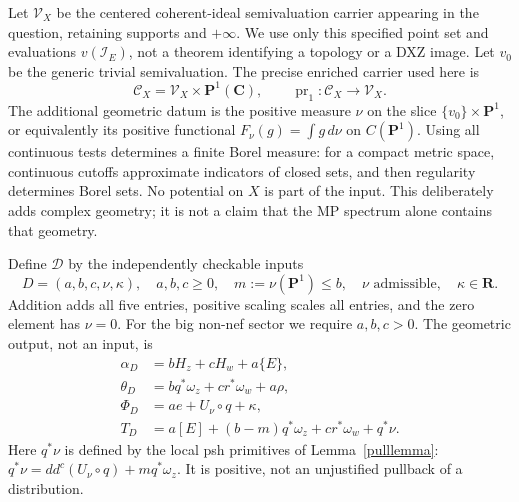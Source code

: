\documentclass[11pt]{article}
\theoremstyle{remark}\newtheorem{remark}[theorem]{Remark}
\newcommand{\ddc}{dd^c}
\newcommand{\PP}{\mathbf P^1}
\newcommand{\R}{\mathbf R}
\begin{document}
Let $\mathscr V_X$ be the centered coherent-ideal semivaluation
carrier appearing in the question, retaining supports and
$+\infty$. We use only this specified point set and evaluations
$v(\mathcal I_E)$, not a theorem identifying a topology or a
DXZ image. Let $v_0$ be the generic trivial semivaluation.
The precise enriched carrier used here is
\[
 \mathscr C_X=\mathscr V_X\times\PP(\mathbf C),\qquad
 \operatorname{pr}_1:\mathscr C_X\longrightarrow\mathscr V_X.
 \tag{3.1}
\]
The additional geometric datum is the positive measure $\nu$ on the
slice $\{v_0\}\times\PP$, or equivalently its positive functional
$F_\nu(g)=\int g\,d\nu$ on $C(\PP)$.
Using all continuous tests determines a finite Borel measure:
for a compact metric space, continuous cutoffs approximate indicators
of closed sets, and then regularity determines Borel sets.
No potential on $X$ is part of the input.
This deliberately adds complex geometry; it is not a claim that the
MP spectrum alone contains that geometry.

Define $\mathscr D$ by the independently checkable inputs
\[
 D=(a,b,c,\nu,\kappa),\quad a,b,c\geq0,\quad
 m:=\nu(\PP)\leq b,\quad \nu\text{ admissible},\quad\kappa\in\R.
 \tag{3.2}
\]
Addition adds all five entries, positive scaling scales all entries,
and the zero element has $\nu=0$.
For the big non-nef sector we require $a,b,c>0$.
The geometric output, not an input, is
\[
 \begin{split}
 \alpha_D&=bH_z+cH_w+a\{E\},\\
 \theta_D&=bq^*\omega_z+cr^*\omega_w+a\rho,\\
 \Phi_D&=ae+U_\nu\circ q+\kappa,\\
 T_D&=a[E]+(b-m)q^*\omega_z+cr^*\omega_w+q^*\nu.
 \end{split}\tag{3.3}
\]
Here $q^*\nu$ is defined by the local psh primitives of
Lemma~\ref{pulllemma}: $q^*\nu=\ddc(U_\nu\circ q)+m q^*\omega_z$.
It is positive, not an unjustified pullback of a distribution.
\end{document}
